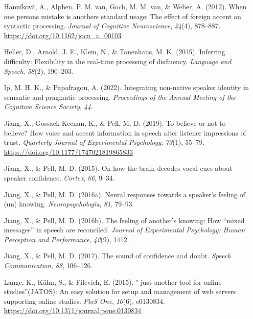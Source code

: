 \documentclass[
  man,floatsintext]{apa7}
\newlength{\cslhangindent}
\newlength{\cslentryspacingunit} %
\newenvironment{CSLReferences}[2] %
 {%
  \setlength{\parindent}{0pt}
  \ifodd #1
  \let\oldpar\par
  \def\par{\hangindent=\cslhangindent\oldpar}
  \fi
  \setlength{\parskip}{#2\cslentryspacingunit}
 }%
 {}
\begin{document}
\begin{CSLReferences}{1}{0}
\leavevmode{}%
Hanuíková, A., Alphen, P. M. van, Goch, M. M. van, \& Weber, A. (2012). When one person{\textquotesingle}s mistake is another{\textquotesingle}s standard usage: The effect of foreign accent on syntactic processing. \emph{Journal of Cognitive Neuroscience}, \emph{24}(4), 878--887. \url{https://doi.org/10.1162/jocn_a_00103}

\leavevmode{}%
Heller, D., Arnold, J. E., Klein, N., \& Tanenhaus, M. K. (2015). Inferring difficulty: Flexibility in the real-time processing of disfluency. \emph{Language and Speech}, \emph{58}(2), 190--203.

\leavevmode{}%
Ip, M. H. K., \& Papafragou, A. (2022). Integrating non-native speaker identity in semantic and pragmatic processing. \emph{Proceedings of the Annual Meeting of the Cognitive Science Society}, \emph{44}.

\leavevmode{}%
Jiang, X., Gossack-Keenan, K., \& Pell, M. D. (2019). To believe or not to believe? {How voice and accent information in speech alter listener impressions of trust}. \emph{Quarterly Journal of Experimental Psychology}, \emph{73}(1), 55--79. \url{https://doi.org/10.1177/1747021819865833}

\leavevmode{}%
Jiang, X., \& Pell, M. D. (2015). On how the brain decodes vocal cues about speaker confidence. \emph{Cortex}, \emph{66}, 9--34.

\leavevmode{}%
Jiang, X., \& Pell, M. D. (2016a). Neural responses towards a speaker's feeling of (un) knowing. \emph{Neuropsychologia}, \emph{81}, 79--93.

\leavevmode{}%
Jiang, X., \& Pell, M. D. (2016b). The feeling of another's knowing: How {``mixed messages''} in speech are reconciled. \emph{Journal of Experimental Psychology: Human Perception and Performance}, \emph{42}(9), 1412.

\leavevmode{}%
Jiang, X., \& Pell, M. D. (2017). The sound of confidence and doubt. \emph{Speech Communication}, \emph{88}, 106--126.

\leavevmode{}%
Lange, K., Kühn, S., \& Filevich, E. (2015). " just another tool for online studies''(JATOS): An easy solution for setup and management of web servers supporting online studies. \emph{PloS One}, \emph{10}(6), e0130834. \url{https://doi.org/10.1371/journal.pone.0130834}


\end{CSLReferences}
\end{document}

